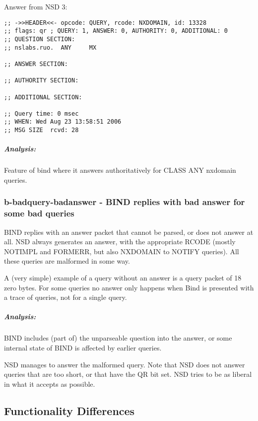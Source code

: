 \documentclass[twoside,titlepage,english]{nlnetlabs}
\begin{document}
Answer from NSD 3:

\footnotesize
\begin{verbatim}
;; ->>HEADER<<- opcode: QUERY, rcode: NXDOMAIN, id: 13328
;; flags: qr ; QUERY: 1, ANSWER: 0, AUTHORITY: 0, ADDITIONAL: 0
;; QUESTION SECTION:
;; nslabs.ruo.  ANY     MX

;; ANSWER SECTION:

;; AUTHORITY SECTION:

;; ADDITIONAL SECTION:

;; Query time: 0 msec
;; WHEN: Wed Aug 23 13:58:51 2006
;; MSG SIZE  rcvd: 28
\end{verbatim}
\normalsize

\vspace{-8pt}\subparagraph{Analysis:}

Feature of bind where it answers authoritatively for CLASS ANY 
nxdomain queries.


\subsubsection{b-badquery-badanswer - BIND replies with bad answer for
                            some bad queries}
\label{b-badquery-badanswer}

BIND replies with an answer packet that cannot be parsed, or does
not answer at all. NSD always generates
an answer, with the appropriate RCODE (mostly NOTIMPL and FORMERR, but
also NXDOMAIN to NOTIFY queries). All these queries are malformed in 
some way. 

A (very simple) example of a query without an answer
is a query packet of 18 zero bytes. For some queries no answer
only happens when Bind is presented with a trace of queries, not for 
a single query.

\vspace{-8pt}\subparagraph{Analysis:}

BIND includes (part of) the unparseable question into the answer, or
some internal state of BIND is affected by earlier queries. 

NSD manages to answer the malformed query. Note that NSD does not answer 
queries that are too short, or that have the QR bit set. NSD tries to be
as liberal in what it accepts as possible.


\subsection{Functionality Differences}
\label{sec:funcdiff}
\end{document}
